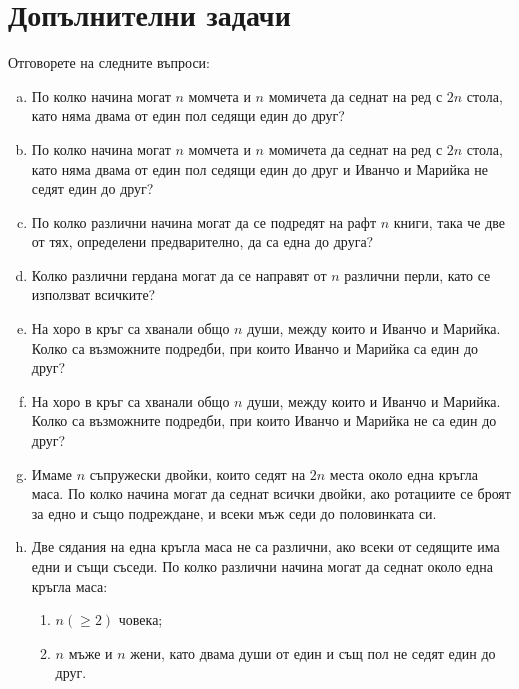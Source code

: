 \section{Допълнителни задачи}

\begin{problem}
  Отговорете на следните въпроси:
  \begin{enumerate}[a)]
  \item
    По колко начина могат $n$ момчета и $n$ момичета да седнат на ред с $2n$ стола, като няма двама от един пол седящи един до друг?
  \item
    По колко начина могат $n$ момчета и $n$ момичета да седнат на ред с $2n$ стола, като няма двама от един пол седящи един до друг и Иванчо и Марийка не седят един до друг? 
  \item
    По колко различни начина могат да се подредят на рафт $n$ книги, така че две от тях, определени предварително, да са една до друга?
  \item
    Колко различни гердана могат да се направят от $n$ различни перли, като се използват всичките?
  \item
    На хоро в кръг са хванали общо $n$ души, между които и Иванчо и Марийка.
    Колко са възможните подредби, при които Иванчо и Марийка са един до друг?
 \item
    На хоро в кръг са хванали общо $n$ души, между които и Иванчо и Марийка.
    Колко са възможните подредби, при които Иванчо и Марийка не са един до друг?
  \item
    Имаме $n$ съпружески двойки, които седят на $2n$ места около една кръгла маса. 
    По колко начина могат да седнат всички двойки, ако ротациите се броят за едно и също подреждане, и
    всеки мъж седи до половинката си.
  \item
    Две сядания на една кръгла маса не са различни, ако всеки от седящите има едни и същи съседи.
    По колко различни начина могат да седнат около една кръгла маса:
    \begin{enumerate}
    \item
      $n (\geq 2)$ човека;
    \item
      $n$ мъже и $n$ жени, като двама души от един и същ пол не седят един до друг.
    \end{enumerate}
  \end{enumerate}
\end{problem}

